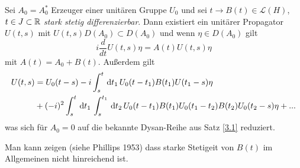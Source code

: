 \documentclass{mycourse}
\begin{document}
\begin{st}[R.S. Phillips 1953]
Sei $A_0=A_0^*$ Erzeuger einer unitären Gruppe $U_0$ und sei $t\to B(t)\in \mathcal L(H)$, $t\in J\subset \R$ \emph{stark stetig differenzierbar}. Dann existiert ein unitärer Propagator $U(t,s)$ mit
$U(t,s) D(A_0)\subset D(A_0)$ und wenn $\eta \in D(A_0)$ gilt
\[
i\frac{d}{dt} U(t,s)\eta= A(t) U(t, s) \eta
\]
mit $A(t)=A_0+B(t)$. Außerdem gilt
\begin{align*}
U(t,s)&=U_0(t-s)-i \int_s^t \dx[t_1] U_0(t-t_1) B(t_1) U(t_1-s) \eta \\ &+(-i)^2 \int_s^t \dx[t_1] \int_s^{t_1} \dx[t_2] U_0(t-t_1) B(t_1) U_0(t_1-t_2) B(t_2) U_0(t_2-s)\eta+ ...
\end{align*}
was sich für $A_0=0$ auf die bekannte Dysan-Reihe aus Satz \ref{3.1} reduziert.
\end{st}
\begin{nt*}
Man kann zeigen (siehe Phillips 1953) dass starke Stetigeit von $B(t)$ im Allgemeinen nicht hinreichend ist.
\end{nt*}
\end{document}
